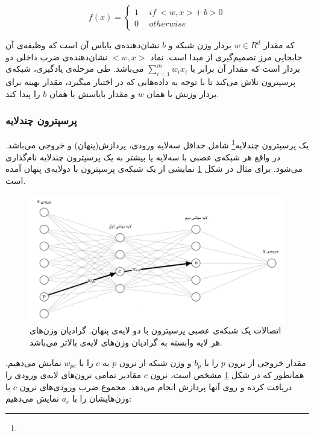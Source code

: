 \begin{equation}
\label{eqn:perceptron}
	f(x) = \begin{cases}
	1 & \ \ if \ <w, x> +\ b > 0 \\
	0 & \ \ otherwise
	\end{cases}
\end{equation}

که مقدار $w \in R^d$ بردار وزن  شبکه و $b$ نشان‌دهنده‌ی بایاس آن است که وظیفه‌ی آن جابجایی مرز تصمیم‌گیری از مبدا است. نماد $<w,x>$ نشان‌دهنده‌ی ضرب داخلی دو بردار است که مقدار آن برابر با $\sum_{i=1}^{m}w_i x_i$ می‌باشد.
طی مرحله‌ی یادگیری، شبکه‌ی پرسپترون تلاش می‌کند تا با توجه به داده‌هایی که در اختیار میگیرد، مقدار بهینه برای بردار وزنش یا همان $w$ و مقدار بایاسش یا همان $b$ را پیدا کند.
\subsubsection{پرسپترون‌ چند‌لایه}
یک پرسپترون چند‌لایه\footnote{} شامل حداقل سه‌لایه ورودی، پردازش(پنهان) و خروجی می‌باشد. در واقع هر‌ شبکه‌ی عصبی با سه‌لایه یا بیشتر به یک پرسپترون چندلایه‌ نام‌گذاری می‌شود. برای مثال در شکل \ref{fig:perceptron} نمایشی از یک‌ شبکه‌ی پرسپترون با دو‌لایه‌ی پنهان آمده است. 
\begin{figure}[h]
	\centering
	\includegraphics[scale=0.7]{figures/ml-perceptron.png}
	\caption[اتصالات یک شبکه‌ی عصبی پرسپترون با دو لایه‌ی پنهان]{اتصالات یک شبکه‌ی عصبی پرسپترون با دو لایه‌ی پنهان. گرادیان وزن‌های هر لایه وابسته به گرادیان وزن‌های لایه‌ی بالاتر می‌باشد.}
	\label{fig:perceptron}
\end{figure}
مقدار خروجی از نرون $p$ را با $b_p$ و وزن شبکه از نرون $p$ به $c$ را با $w_{pc}$ نمایش می‌دهیم. همانطور که در شکل \ref{fig:perceptron} مشخص است، نرون $c$ مقادیر تمامی نرون‌های لایه‌ی ورودی را دریافت کرده و روی آنها پردازش انجام می‌دهد. مجموع ضرب ورودی‌های نرون‌ $c$ با وزن‌هایشان را با $a_c$ نمایش می‌دهیم:

